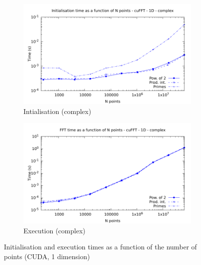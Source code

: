 \documentclass[12pt, a4paper]{article}
\begin{document}
\begin{figure}[H]
\begin{subfigure}{.5\textwidth}
\centering
\includegraphics[width=.9\linewidth]{graphs/fft-cuda-1d-pow2-c-init.pdf}
\caption{Intialisation (complex)}
\label{FFTCUDA1DCI}
\end{subfigure}%
\begin{subfigure}{.5\textwidth}
\centering
\includegraphics[width=.9\linewidth]{graphs/fft-cuda-1d-pow2-c-exec.pdf}
\caption{Execution (complex)}
\label{FFTCUDA1DCE}
\end{subfigure}
\caption{Initialisation and execution times as a function of the number of points (CUDA, 1 dimension)}
\label{FFTCUDA1D}
\end{figure}
\end{document}
